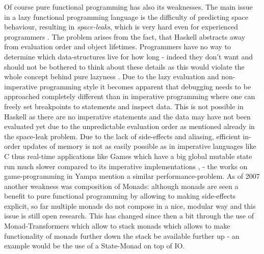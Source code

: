 Of course pure functional programming has also its weaknesses. The main issue in a lazy functional programming language is the difficulty of predicting space behaviour, resulting in \textit{space-leaks}, which is very hard even for experienced programmers \cite{hudak_history_2007}. The problem arises from the fact, that Haskell abstracts away from evaluation order and object lifetimes. Programmers have no way to determine which data-structures live for how long - indeed they don't want and should not be bothered to think about these details as this would violate the whole concept behind pure lazyness \cite{hudak_history_2007}.
Due to the lazy evaluation and non-imperative programming style it becomes apparent that debugging needs to be approached completely different than in imperative programming where one can freely set breakpoints to statements and inspect data. This is not possible in Haskell as there are no imperative statements and the data may have not been evaluated yet due to the unpredictable evaluation order as mentioned already in the space-leak problem.
Due to the lack of side-effects and aliasing, efficient in-order updates of memory is not as easily possible as in imperative languages like C thus real-time applications like Games which have a big global mutable state run much slower compared to its imperative implementations  \cite{mun_hon_functional_2005}, \cite{meisinger_game-engine-architektur_2010} - the works on game-programming in Yampa mention a similar performance-problem.
As of 2007 \cite{hudak_history_2007} another weakness was composition of Monads: although monads are seen a benefit to pure functional programming by allowing to making side-effects explicit, so far multiple monads do not compose in a nice, modular way and this issue is still open research. This has changed since then a bit through the use of Monad-Transformers which allow to stack monads which allows to make functionality of monads further down the stack be available further up - an example would be the use of a State-Monad on top of IO.

